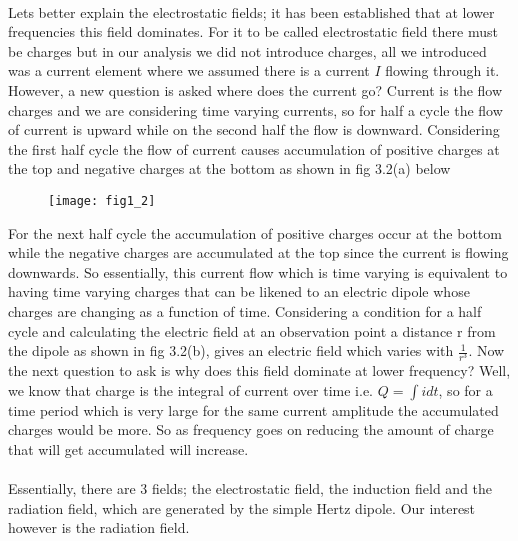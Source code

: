 	\paragraph*{} Lets better explain the electrostatic fields; it has been established that at lower frequencies this field dominates. For it to be called electrostatic field there must be charges but in our analysis we did not introduce charges, all we introduced was a current element where we assumed there is a current $I$ flowing through it. However, a new question is asked where does the current go? Current is the flow charges and we are considering time varying currents, so for half a cycle the flow of current is upward while on the second half the flow is downward. Considering the first half cycle the flow of current causes accumulation of positive charges at the top and negative charges at the bottom as shown in fig 3.2(a) below 
	\begin{figure}[h]
		\vspace{-10pt}
		\texttt{[image: fig1\_2]}
		\vspace{-20pt}
		\centering
		\caption{}
		\vspace{-20pt}
		\label{fig:1}
	\end{figure}\newline
	
	For the next half cycle the accumulation of positive charges occur at the bottom while the negative charges are accumulated at the top since the current is flowing downwards. So essentially, this current flow which is time varying is equivalent to having time varying charges that can be likened to an electric dipole whose charges are changing as a function of time. Considering a condition for a half cycle and calculating the electric field at an observation point a distance r from the dipole as shown in fig 3.2(b), gives an electric field which varies with $\frac{1}{r^3}$. Now the next question to ask is why does this field dominate at lower frequency? Well, we know that charge is the integral of current over time i.e. $Q =\int idt$, so for a time period which is very large for the same current amplitude the accumulated charges would be more. So as frequency goes on reducing the amount of charge that will get accumulated will increase. 
	\paragraph*{} Essentially, there are 3 fields; the electrostatic field, the induction field and the radiation field, which are generated by the simple Hertz dipole. Our interest however is the radiation field. 
